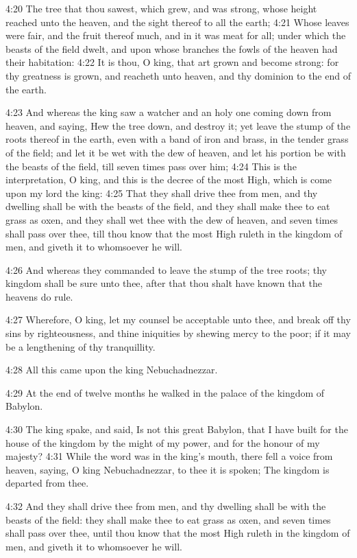 4:20 The tree that thou sawest, which grew, and was strong, whose
height reached unto the heaven, and the sight thereof to all the
earth; 4:21 Whose leaves were fair, and the fruit thereof much, and in
it was meat for all; under which the beasts of the field dwelt, and
upon whose branches the fowls of the heaven had their habitation: 4:22
It is thou, O king, that art grown and become strong: for thy
greatness is grown, and reacheth unto heaven, and thy dominion to the
end of the earth.

4:23 And whereas the king saw a watcher and an holy one coming down
from heaven, and saying, Hew the tree down, and destroy it; yet leave
the stump of the roots thereof in the earth, even with a band of iron
and brass, in the tender grass of the field; and let it be wet with
the dew of heaven, and let his portion be with the beasts of the
field, till seven times pass over him; 4:24 This is the
interpretation, O king, and this is the decree of the most High, which
is come upon my lord the king: 4:25 That they shall drive thee from
men, and thy dwelling shall be with the beasts of the field, and they
shall make thee to eat grass as oxen, and they shall wet thee with the
dew of heaven, and seven times shall pass over thee, till thou know
that the most High ruleth in the kingdom of men, and giveth it to
whomsoever he will.

4:26 And whereas they commanded to leave the stump of the tree roots;
thy kingdom shall be sure unto thee, after that thou shalt have known
that the heavens do rule.

4:27 Wherefore, O king, let my counsel be acceptable unto thee, and
break off thy sins by righteousness, and thine iniquities by shewing
mercy to the poor; if it may be a lengthening of thy tranquillity.

4:28 All this came upon the king Nebuchadnezzar.

4:29 At the end of twelve months he walked in the palace of the
kingdom of Babylon.

4:30 The king spake, and said, Is not this great Babylon, that I have
built for the house of the kingdom by the might of my power, and for
the honour of my majesty?  4:31 While the word was in the king's
mouth, there fell a voice from heaven, saying, O king Nebuchadnezzar,
to thee it is spoken; The kingdom is departed from thee.

4:32 And they shall drive thee from men, and thy dwelling shall be
with the beasts of the field: they shall make thee to eat grass as
oxen, and seven times shall pass over thee, until thou know that the
most High ruleth in the kingdom of men, and giveth it to whomsoever he
will.

